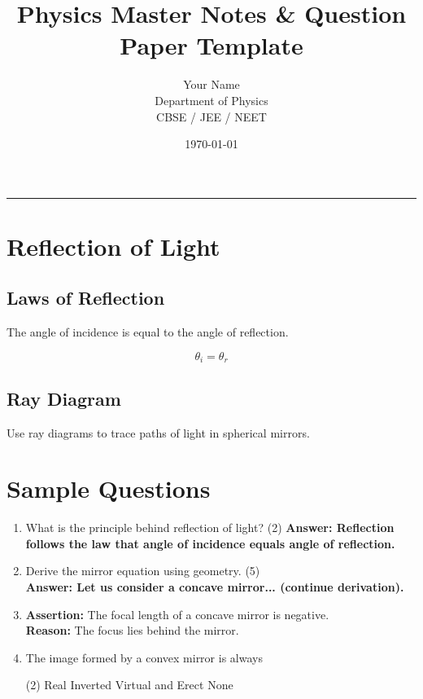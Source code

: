 \documentclass[11pt,a4paper]{extarticle}
\title{\Huge Physics Master Notes \& Question Paper Template}
\author{Your Name \\ \small Department of Physics \\ \small CBSE / JEE / NEET}
\date{\today}
\newcommand{\mcqquestion}[5]{%
  \item #1 \hfill \textbf{}%
  \begin{tasks}(2)
    \task #2
    \task #3
    \task #4
    \task #5
  \end{tasks}
}
\begin{document}
\maketitle
\hrule
\vspace{1em}


\section{Reflection of Light}
\subsection{Laws of Reflection}
\begin{noteBox}
The angle of incidence is equal to the angle of reflection.
\end{noteBox}

\begin{formulaBox}
\[
\theta_i = \theta_r
\]
\end{formulaBox}

\subsection{Ray Diagram}
\begin{center}
\end{center}

\begin{tipBox}
Use ray diagrams to trace paths of light in spherical mirrors.
\end{tipBox}

\section*{Sample Questions}

\begin{enumerate}
  \item What is the principle behind reflection of light? (2)
  \textbf{Answer: Reflection follows the law that angle of incidence equals angle of reflection.}

  \item Derive the mirror equation using geometry. (5)\\
  \textbf{Answer: Let us consider a concave mirror... (continue derivation).}

  \item \textbf{Assertion:} The focal length of a concave mirror is negative. \\
        \textbf{Reason:} The focus lies behind the mirror.

  \mcqquestion{The image formed by a convex mirror is always}{Real}{Inverted}{Virtual and Erect}{None}

\end{enumerate}

\end{document}
